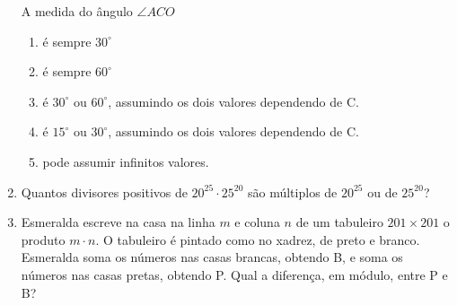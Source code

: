 \documentclass[12pt]{article}
\begin{document}
\begin{enumerate}[label=\textbf{\arabic*.}]
          A medida do ângulo \(\angle ACO\)

          \begin{enumerate}[label=({\Alph*})]
            \item é sempre $30^{\circ}$
            \item é sempre $60^{\circ}$
            \item  é $30^{\circ}$ ou $60^{\circ}$, assumindo os dois valores dependendo de C.
            \item é $15^{\circ}$ ou $30^{\circ}$, assumindo os dois valores dependendo de C.
            \item pode assumir infinitos valores.
          \end{enumerate}
        \item   Quantos divisores positivos de \(20^{25} \cdot 25^{20}\) são múltiplos de $20^{25}$ ou de $25^{20}$?
        \item Esmeralda escreve na casa na linha \(m\) e coluna \(n\) de um tabuleiro \(201 \times 201\) o produto \(m \cdot n\). O tabuleiro 
          é pintado como no xadrez, de preto e branco. Esmeralda soma os números nas casas brancas, obtendo B, e soma os números nas casas
          pretas, obtendo P. Qual a diferença, em módulo, entre P e B?
      \end{enumerate}
\end{document}
